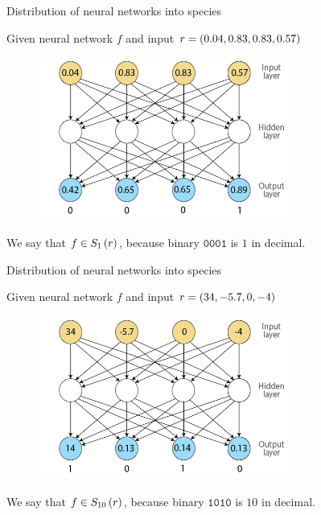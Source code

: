 \begin{frame}{Distribution of neural networks into species}
\begin{center}
Given neural network $f$ and input $r = (0.04, 0.83, 0.83, 0.57)$
  \begin{figure}[p]
  \includegraphics[width=0.75\textwidth]{images/nntdexample1.png}
  \end{figure}
We say that $f \in S_{1}\left(r\right)$, because binary $\texttt{0001}$ is $1$ in decimal.
\end{center}
\end{frame}

\begin{frame}{Distribution of neural networks into species}
\begin{center}
Given neural network $f$ and input $r = (34, -5.7, 0, -4)$
  \begin{figure}[p]
  \includegraphics[width=0.75\textwidth]{images/nntdexample2.png}
  \end{figure}
We say that $f \in S_{10}\left(r\right)$, because binary $\texttt{1010}$ is $10$ in decimal.
\end{center}
\end{frame}

